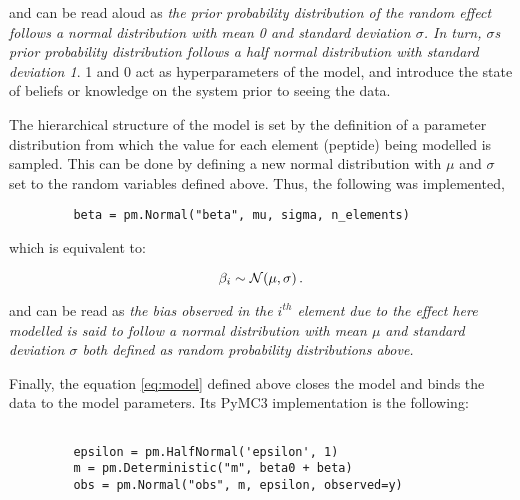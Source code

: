 and can be read aloud as \textit{the prior probability distribution of the random effect follows a normal distribution with mean 0 and standard deviation $\sigma$. In turn, $\sigma$\textquotesingle s prior probability distribution follows a half normal distribution with standard deviation 1}. 1 and 0 act as hyperparameters of the model, and introduce the state of beliefs or knowledge on the system prior to seeing the data.


The hierarchical structure of the model is set by the definition of a parameter distribution from which the value for each element (peptide) being modelled is sampled. This can be done by defining a new normal distribution with $\mu$ and $\sigma$ set to the random variables defined above. Thus, the following was implemented,

\begin{verbatim}
         beta = pm.Normal("beta", mu, sigma, n_elements)  
\end{verbatim}

which is equivalent to:

\begin{equation}
\beta_i \sim \mathcal{N}(\mu, \sigma)\,.  \\
\end{equation}

and can be read as \textit{the bias observed in the $i^{th}$ element due to the effect here modelled is said to follow a normal distribution with mean $\mu$ and standard deviation $\sigma$ both defined as random probability distributions above.}

Finally, the equation \ref{eq:model} defined above closes the model and binds the data to the model parameters. Its PyMC3 implementation is the following:

\begin{verbatim}
               
         epsilon = pm.HalfNormal('epsilon', 1)                
         m = pm.Deterministic("m", beta0 + beta)
         obs = pm.Normal("obs", m, epsilon, observed=y)
      
\end{verbatim}

